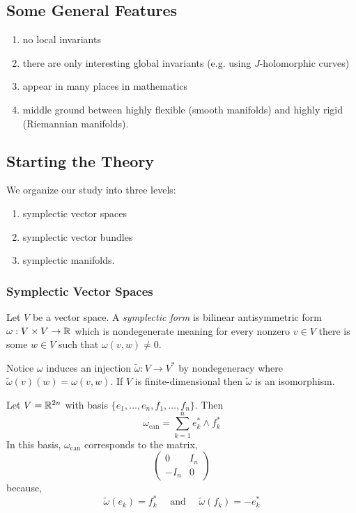 \documentclass[12pt]{article}
\begin{document}
\subsection{Some General Features}

\begin{enumerate}
\item no local invariants
\item there are only interesting global invariants (e.g. using $J$-holomorphic curves)
\item appear in many places in mathematics
\item middle ground between highly flexible (smooth manifolds) and highly rigid (Riemannian manifolds).
\end{enumerate}

\subsection{Starting the Theory}

We organize our study into three levels:
\begin{enumerate}
\item symplectic vector spaces
\item symplectic vector bundles
\item symplectic manifolds.
\end{enumerate}

\subsubsection{Symplectic Vector Spaces}

\begin{defn}
Let $V$ be a vector space. A \textit{symplectic form} is bilinear antisymmetric form $\omega : V \times V \to \mathbb{R}$ which is nondegenerate meaning for every nonzero $v \in V$ there is some $w \in V$ such that $\omega(v, w) \neq 0$. 
\end{defn}

\begin{rmk}
Notice $\omega$ induces an injection $\tilde{\omega} : V \to V^*$ by nondegeneracy where $\tilde{\omega}(v)(w) = \omega(v,w)$. If $V$ is finite-dimensional then $\tilde{\omega}$ is an isomorphism.
\end{rmk}

\newcommand{\can}{\text{can}}

\begin{example}
Let $V = \mathbb{R}^{2n}$ with basis $\{ e_1, \dots, e_n, f_1, \dots, f_n \}$. Then 
\[ \omega_{\can} = \sum_{k = 1}^n e_k^* \wedge f_k^* \]
In this basis, $\omega_{\can}$ corresponds to the matrix,
\[ \begin{pmatrix}
0 & I_n
\\
- I_n & 0 
\end{pmatrix} \]    
because,
\[ \tilde{\omega}(e_k) = f_k^* \quad \text{ and } \quad \tilde{\omega}(f_k) = - e_k^* \]
\end{example}
\end{document}
